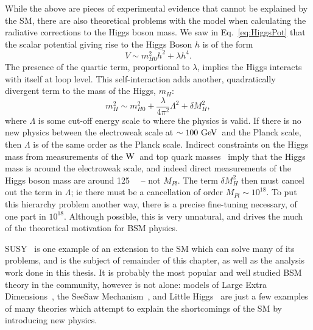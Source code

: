 While the above are pieces of experimental evidence that cannot be explained by the \ac{SM}, 
there are also theoretical problems with the model when calculating the radiative corrections to the Higgs boson mass.
We saw in Eq.~\ref{eq:HiggsPot} that the scalar potential giving rise to the Higgs Boson $h$ is of the form
\begin{equation}
V \sim m_{H0}^{2} h^{2} + \lambda h^{4}.
\end{equation}
The presence of the quartic term, proportional to $\lambda$, implies the Higgs interacts with itself at loop level. 
This self-interaction adds another, quadratically divergent term to the mass of the Higgs, $m_{H}$:
\begin{equation}
m_{H}^{2} \sim m_{H0}^{2} + \frac{\lambda}{4 \pi ^{2}} \Lambda^{2} + \delta M_{H}^{2},
\label{oneloopHiggsMass}
\end{equation}
where $\Lambda$ is some cut-off energy scale to where the physics is valid.
If there is no new physics between the electroweak scale at $\sim 100~\mathrm{GeV}\,$ and the Planck scale, then $\Lambda$ is of the same order as the Planck scale.
Indirect constraints on the Higgs mass from measurements of the $\mathrm{W}\,$ and top quark masses~\cite{higgsMassConstraint1,higgsMassConstraint2} imply that the Higgs mass is around the electroweak scale, and indeed direct measurements of the Higgs boson mass are around 125~\GeV~\cite{HiggsLegacyCMS,HiggsLegacyATLAS} -- not $M_{Pl}$.
The term $\delta M_{H}^{2}$ then must cancel out the term in $\Lambda$; ie there must be a cancellation of order $M_{Pl} \sim 10^{18}$.
To put this hierarchy problem another way, there is a precise fine-tuning necessary, of one part in $10^{18}$.
Although possible, this is very unnatural, and drives the much of the theoretical motivation for \ac{BSM} physics.



\ac{SUSY}~\cite{susyMot1,susyMot2} is one example of an extension to the \ac{SM} which can solve many of its problems, and is the subject of remainder of this chapter, as well as the analysis work done in this thesis. 
It is probably the most popular and well studied \ac{BSM} theory in the community, however is not alone: models of
Large Extra Dimensions~\cite{ADDextraDimensions}, the 
SeeSaw Mechanism~\cite{seesawMech1,seesawMech2}, and
Little Higgs~\cite{LittleHiggsRev}
are just a few examples of many theories which attempt to explain the shortcomings of the \ac{SM} by introducing new physics.



